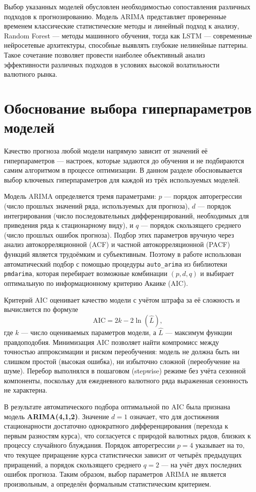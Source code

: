 Выбор указанных моделей обусловлен необходимостью сопоставления различных подходов к прогнозированию. Модель ARIMA представляет проверенные временем классические статистические методы и линейный подход к анализу, Random Forest — методы машинного обучения, тогда как LSTM — современные нейросетевые архитектуры, способные выявлять глубокие нелинейные паттерны. Такое сочетание позволяет провести наиболее объективный анализ эффективности различных подходов в условиях высокой волатильности валютного рынка.

\section{Обоснование выбора гиперпараметров моделей}
Качество прогноза любой модели напрямую зависит от значений её гиперпараметров — настроек, которые задаются до обучения и не подбираются самим алгоритмом в процессе оптимизации. В данном разделе обосновывается выбор ключевых гиперпараметров для каждой из трёх используемых моделей.

Модель ARIMA определяется тремя параметрами: $p$ — порядок авторегрессии (число прошлых значений ряда, используемых для прогноза), $d$ — порядок интегрирования (число последовательных дифференцирований, необходимых для приведения ряда к стационарному виду), и $q$ — порядок скользящего среднего (число прошлых ошибок прогноза). Подбор этих параметров вручную через анализ автокорреляционной (ACF) и частной автокорреляционной (PACF) функций является трудоёмким и субъективным. Поэтому в работе использован автоматический подбор с помощью процедуры \texttt{auto\_arima} из библиотеки \texttt{pmdarima}, которая перебирает возможные комбинации $(p,d,q)$ и выбирает оптимальную по информационному критерию Акаике (AIC).

Критерий AIC оценивает качество модели с учётом штрафа за её сложность и вычисляется по формуле
$$\mathrm{AIC} = 2k - 2\ln(\hat{L}),$$
где $k$ — число оцениваемых параметров модели, а $\hat{L}$ — максимум функции правдоподобия. Минимизация AIC позволяет найти компромисс между точностью аппроксимации и риском переобучения: модель не должна быть ни слишком простой (высокая ошибка), ни избыточно сложной (переобучение на шуме). Перебор выполнялся в пошаговом (stepwise) режиме без учёта сезонной компоненты, поскольку для ежедневного валютного ряда выраженная сезонность не характерна.

В результате автоматического подбора оптимальной по AIC была признана модель \textbf{ARIMA(4,1,2)}. Значение $d=1$ означает, что для достижения стационарности достаточно однократного дифференцирования (перехода к первым разностям курса), что согласуется с природой валютных рядов, близких к процессу случайного блуждания. Порядок авторегрессии $p=4$ указывает на то, что текущее приращение курса статистически зависит от четырёх предыдущих приращений, а порядок скользящего среднего $q=2$ — на учёт двух последних ошибок прогноза. Таким образом, выбор параметров ARIMA не является произвольным, а определён формальным статистическим критерием.


